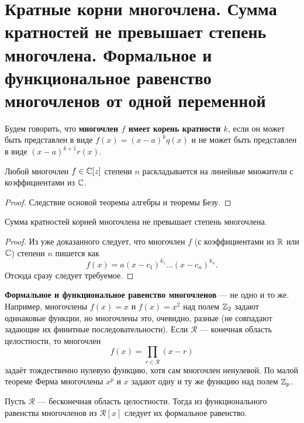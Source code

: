 \section{Кратные корни многочлена. Сумма кратностей не превышает степень многочлена. Формальное и функциональное равенство многочленов от одной переменной}

\begin{definition}
    Будем говорить, что \textbf{многочлен $f$ имеет корень кратности $k$}, если он может быть представлен в виде $f(x) = (x - a)^kq(x)$ и не может быть представлен в виде $(x - a)^{k + 1}r(x)$.
\end{definition}

\begin{statement}
    Любой многочлен $f \in \mathbb{C}[z]$ степени $n$ раскладывается на линейные множители с коэффициентами из $\mathbb{C}$.
\end{statement}

\begin{proof}
    Следствие основой теоремы алгебры и теоремы Безу.
\end{proof}

\begin{statement}
    Сумма кратностей корней многочлена не превышает степень многочлена.
\end{statement}

\begin{proof}
    Из уже доказанного следует, что многочлен $f$ (с коэффициентами из $\mathbb{R}$ или $\mathbb{C}$) степени $n$ пишется как
    $$
    f(x) = a(x - c_1)^{k_1}\ldots(x - c_n)^{k_n}.
    $$
    Отсюда сразу следует требуемое.
\end{proof}

\textbf{Формальное и функциональное равенство многочленов} --- не одно и то же. Например, многочлены $f(x) = x$ и $f(x) = x^2$ над полем $\mathbb{Z}_2$ задают одинаковые функции, но многочлены это, очевидно, разные (не совпадают задающие их финитные последовательности). Если $\mathcal{R}$ --- конечная область целостности, то многочлен
$$
f(x) = \prod_{r \in \mathcal{R}}(x - r)
$$
задаёт тождественно нулевую функцию, хотя сам многочлен ненулевой. По малой теореме Ферма многочлены $x^p$ и $x$ задают одну и ту же функцию над полем $\mathbb{Z}_p$.

\begin{theorem}
    Пусть $\mathcal{R}$ --- бесконечная область целостности. Тогда из функционального равенства многочленов из $\mathcal{R}[x]$ следует их формальное равенство.
\end{theorem}


